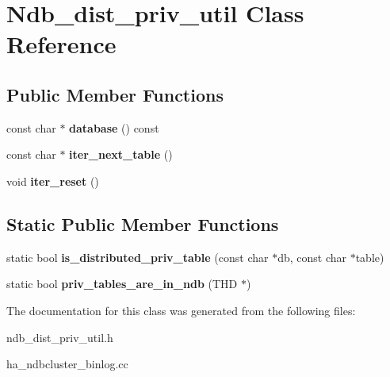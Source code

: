 \hypertarget{classNdb__dist__priv__util}{}\section{Ndb\+\_\+dist\+\_\+priv\+\_\+util Class Reference}
\label{classNdb__dist__priv__util}
\subsection*{Public Member Functions}
\begin{DoxyCompactItemize}
\item 
\mbox{\label{classNdb__dist__priv__util_a3a80dd3be2f477f42696d86ca4adda3a}} 
const char $\ast$ {\bfseries database} () const
\item 
\mbox{\label{classNdb__dist__priv__util_a74591487604f05fff610a520c1a89670}} 
const char $\ast$ {\bfseries iter\+\_\+next\+\_\+table} ()
\item 
\mbox{\label{classNdb__dist__priv__util_ae11aa7cc48dd338b8ea0c24889f8096a}} 
void {\bfseries iter\+\_\+reset} ()
\end{DoxyCompactItemize}
\subsection*{Static Public Member Functions}
\begin{DoxyCompactItemize}
\item 
\mbox{\label{classNdb__dist__priv__util_a2829163221d6cc686c2de38d1ba24357}} 
static bool {\bfseries is\+\_\+distributed\+\_\+priv\+\_\+table} (const char $\ast$db, const char $\ast$table)
\item 
\mbox{\label{classNdb__dist__priv__util_a3d708358f41e0e81fa3322f63191ed20}} 
static bool {\bfseries priv\+\_\+tables\+\_\+are\+\_\+in\+\_\+ndb} (T\+HD $\ast$)
\end{DoxyCompactItemize}


The documentation for this class was generated from the following files\+:\begin{DoxyCompactItemize}
\item 
ndb\+\_\+dist\+\_\+priv\+\_\+util.\+h\item 
ha\+\_\+ndbcluster\+\_\+binlog.\+cc\end{DoxyCompactItemize}
